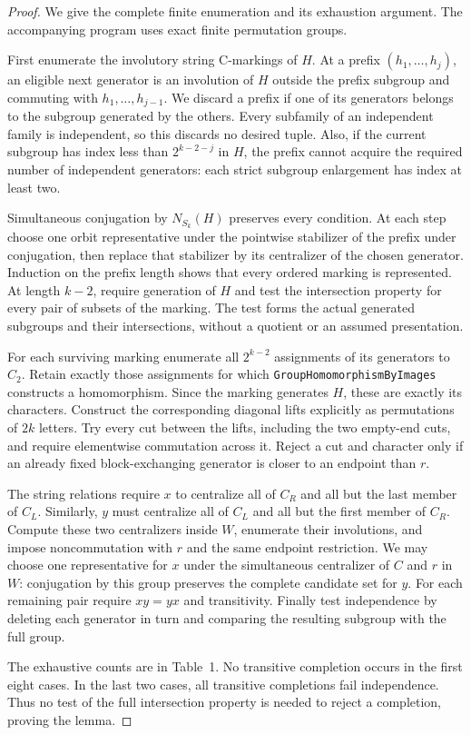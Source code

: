 \begin{proof}
We give the complete finite enumeration and its exhaustion argument.
The accompanying program uses exact finite permutation groups.

First enumerate the involutory string C-markings of $H$. At a prefix
$(h_1,\ldots,h_j)$, an eligible next generator is an involution of $H$
outside the prefix subgroup and commuting with $h_1,\ldots,h_{j-1}$.
We discard a prefix if one of its generators belongs to the subgroup
generated by the others. Every subfamily of an independent family
is independent, so this discards no desired tuple. Also, if the
current subgroup has index less than $2^{k-2-j}$ in $H$, the prefix
cannot acquire the required number of independent generators: each
strict subgroup enlargement has index at least two.

Simultaneous conjugation by $N_{S_k}(H)$ preserves every condition.
At each step choose one orbit representative under the pointwise
stabilizer of the prefix under conjugation, then replace that
stabilizer by its centralizer of the chosen generator. Induction on
the prefix length shows that every ordered marking is represented.
At length $k-2$, require generation of $H$ and test the intersection
property for every pair of subsets of the marking. The test forms
the actual generated subgroups and their intersections, without a
quotient or an assumed presentation.

For each surviving marking enumerate all $2^{k-2}$ assignments of
its generators to $C_2$. Retain exactly those assignments for which
\texttt{GroupHomomorphismByImages} constructs a homomorphism.
Since the marking generates $H$, these are exactly its characters.
Construct the corresponding diagonal lifts explicitly as
permutations of $2k$ letters. Try every cut between the lifts,
including the two empty-end cuts, and require elementwise
commutation across it. Reject a cut and character only if an
already fixed block-exchanging generator is closer to an endpoint
than $r$.

The string relations require $x$ to centralize all of $C_R$ and
all but the last member of $C_L$. Similarly, $y$ must centralize
all of $C_L$ and all but the first member of $C_R$. Compute these
two centralizers inside $W$, enumerate their involutions, and impose
noncommutation with $r$ and the same endpoint restriction. We may
choose one representative for $x$ under the simultaneous centralizer
of $C$ and $r$ in $W$: conjugation by this group preserves the complete
candidate set for $y$. For each remaining pair require $xy=yx$ and
transitivity. Finally test independence by deleting each generator
in turn and comparing the resulting subgroup with the full group.

The exhaustive counts are in Table~1. No transitive completion occurs
in the first eight cases. In the last two cases, all transitive
completions fail independence. Thus no test of the full intersection
property is needed to reject a completion, proving the lemma.
\end{proof}

